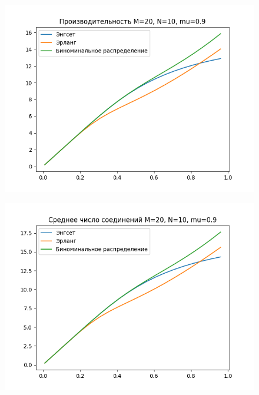 \documentclass[12pt]{article}
\begin{document}
\begin{figure}[!htb]
\centering
\includegraphics[scale=1.00]{assets/iss_1/perf_M20_N10_mu09.png}
\caption{}
\label{}
\end{figure}

\begin{figure}[!htb]
\centering
\includegraphics[scale=1.00]{assets/iss_1/aver_conn_M20_N10_mu09.png}
\caption{}
\label{}
\end{figure}
\end{document}
